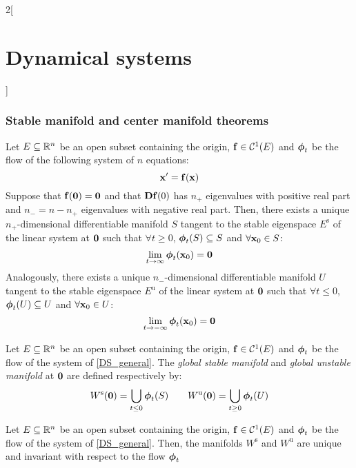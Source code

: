 \documentclass[../../../main_math.tex]{subfiles}
\begin{document}
\begin{multicols}{2}[\section{Dynamical systems}]
  \subsubsection{Stable manifold and center manifold theorems}
  \begin{theorem}
    Let $E\subseteq\mathbb{R}^n$ be an open subset containing the origin, $\boldsymbol{\mathrm{f}}\in\mathcal{C}^1(E)$ and $\boldsymbol{\mathrm{\phi}}_t$ be the flow of the following system of $n$ equations:
    \begin{equation}\label{DS_general}
      \boldsymbol{\mathrm{x}}' =\boldsymbol{\mathrm{f}}(\boldsymbol{\mathrm{x}})
    \end{equation}
    Suppose that $\boldsymbol{\mathrm{f}}(\boldsymbol{\mathrm{0}})=\boldsymbol{\mathrm{0}}$ and that $\boldsymbol{\mathrm{Df}}(0)$ has $n_+$ eigenvalues with positive real part and $n_-=n-n_+$ eigenvalues with negative real part. Then, there exists a unique $n_+$-dimensional differentiable manifold $S$ tangent to the stable eigenspace $E^\text{s}$ of the linear system at $\boldsymbol{\mathrm{0}}$ such that $\forall t\geq 0$, $\boldsymbol{\mathrm{\phi}}_t(S)\subseteq S$ and $\forall \boldsymbol{\mathrm{x}}_0\in S$: $$\lim_{t\to\infty}\boldsymbol{\mathrm{\phi}}_t(\boldsymbol{\mathrm{x}}_0)=\boldsymbol{\mathrm{0}}$$
    Analogously, there exists a unique $n_-$-dimensional differentiable manifold $U$ tangent to the stable eigenspace $E^\text{u}$ of the linear system at $\boldsymbol{\mathrm{0}}$ such that $\forall t\leq 0$, $\boldsymbol{\mathrm{\phi}}_t(U)\subseteq U$ and $\forall \boldsymbol{\mathrm{x}}_0\in U$: $$\lim_{t\to-\infty}\boldsymbol{\mathrm{\phi}}_t(\boldsymbol{\mathrm{x}}_0)=\boldsymbol{\mathrm{0}}$$
  \end{theorem}
  \begin{definition}
    Let $E\subseteq\mathbb{R}^n$ be an open subset containing the origin, $\boldsymbol{\mathrm{f}}\in\mathcal{C}^1(E)$ and $\boldsymbol{\mathrm{\phi}}_t$ be the flow of the system of \cref{DS_general}. The \emph{global stable manifold} and \emph{global unstable manifold} at $\boldsymbol{\mathrm{0}}$ are defined respectively by:
    $$W^\text{s}(\boldsymbol{\mathrm{0}})=\bigcup_{t\leq 0}\boldsymbol{\mathrm{\phi}}_t(S)\qquad W^\text{u}(\boldsymbol{\mathrm{0}})=\bigcup_{t\geq 0}\boldsymbol{\mathrm{\phi}}_t(U)$$
  \end{definition}
  \begin{proposition}
    Let $E\subseteq\mathbb{R}^n$ be an open subset containing the origin, $\boldsymbol{\mathrm{f}}\in\mathcal{C}^1(E)$ and $\boldsymbol{\mathrm{\phi}}_t$ be the flow of the system of \cref{DS_general}. Then, the manifolds $W^\text{s}$ and $W^\text{u}$ are unique and invariant with respect to the flow $\boldsymbol{\mathrm{\phi}}_t$
  \end{proposition}
  \begin{theorem}

\end{theorem}
\end{multicols}
\end{document}
